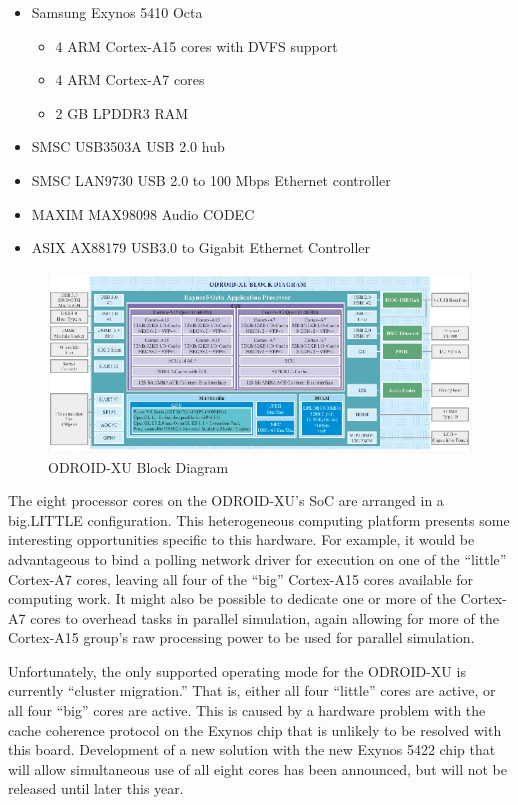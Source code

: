 \documentclass[11pt]{book}
\begin{document}
\begin{itemize}
\item Samsung Exynos 5410 Octa
  \begin{itemize}
  \item 4 ARM Cortex-A15 cores with DVFS support
  \item 4 ARM Cortex-A7 cores
  \item 2 GB LPDDR3 RAM
  \end{itemize}
\item SMSC USB3503A USB 2.0 hub
\item SMSC LAN9730 USB 2.0 to 100 Mbps Ethernet controller
\item MAXIM MAX98098 Audio CODEC
\item ASIX AX88179 USB3.0 to Gigabit Ethernet Controller
\end{itemize}

\begin{figure}
\centering
\includegraphics[width=\textwidth]{odroid_xu_block_diagram}
\caption{ODROID-XU Block Diagram
  \cite{odroid-xu-board-detail}}\label{odroid-xu-block-diagram}
\end{figure}

The eight processor cores on the ODROID-XU's SoC are arranged in a big.LITTLE
configuration.  This heterogeneous computing platform presents some interesting
opportunities specific to this hardware.  For example, it would be advantageous to bind a
polling network driver for execution on one of the ``little'' Cortex-A7 cores, leaving all
four of the ``big'' Cortex-A15 cores available for computing work.  It might also be
possible to dedicate one or more of the Cortex-A7 cores to overhead tasks in parallel
simulation, again allowing for more of the Cortex-A15 group's raw processing power to be
used for parallel simulation.  

Unfortunately, the only supported operating mode for the ODROID-XU is currently ``cluster
migration.''  That is, either all four ``little'' cores are active, or all four ``big''
cores are active.  This is caused by a hardware problem with the cache coherence protocol
on the Exynos chip that is unlikely to be resolved with this board.  Development of a new
solution with the new Exynos 5422 chip that will allow simultaneous use of all eight cores
has been announced, but will not be released until later this year.
\end{document}
